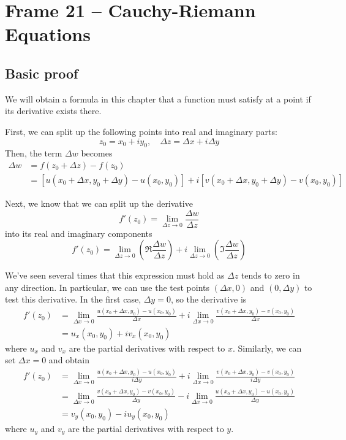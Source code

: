\documentclass{article}
\begin{document}
\clearpage
\section{Frame 21 -- Cauchy-Riemann Equations}
\subsection{Basic proof}
We will obtain a formula in this chapter that a function must satisfy at a point if its derivative exists there.

First, we can split up the following points into real and imaginary parts:
\[
	z_0 = x_0 + iy_0,	\quad \Delta z = \Delta x + i \Delta y	
\]
Then, the term $\Delta w$ becomes
\begin{align*}
	\Delta w &= f(z_0 + \Delta z) - f(z_0) \\
	&= [u(x_0 + \Delta x, y_0 + \Delta y) - u(x_0, y_0)]
	+ i[v(x_0 + \Delta x, y_0 + \Delta y) - v(x_0, y_0)]
\end{align*}

Next, we know that we can split up the derivative
\[
	f'(z_0) = \lim_{\Delta z \to 0} \frac{\Delta w}{\Delta z}
\]
into its real and imaginary components
\[
	f'(z_0) = \lim_{\Delta z \to 0} \left( \Re \frac{\Delta w}{\Delta z} \right)
	+ i\lim_{\Delta z \to 0} \left( \Im \frac{\Delta w}{\Delta z} \right)
\]

We've seen several times that this expression must hold as $\Delta z$ tends to zero in any direction. In particular, we can use the test points $(\Delta x, 0)$ and $(0, \Delta y)$ to test this derivative. In the first case, $\Delta y = 0$, so the derivative is
\begin{align*}
	f'(z_0) 
	&= \lim_{\Delta x \to 0} \frac{u(x_0 + \Delta x, y_0) - u(x_0, y_0)}{\Delta x}
	+i \lim_{\Delta x \to 0} \frac{v(x_0 + \Delta x, y_0) - v(x_0, y_0)}{\Delta x} \\
	&= u_x(x_0, y_0) + iv_x(x_0, y_0)
\end{align*}
where $u_x$ and $v_x$ are the partial derivatives with respect to $x$. Similarly, we can set $\Delta x = 0$ and obtain
\begin{align*}
	f'(z_0) 
	&= \lim_{\Delta x \to 0} \frac{u(x_0+ \Delta x,y_0) - u(x_0,y_0)}{i\Delta y}
	+i \lim_{\Delta x \to 0} \frac{v(x_0+ \Delta x,y_0) - v(x_0,y_0)}{i\Delta y} \\
	&= \lim_{\Delta x \to 0} \frac{v(x_0+ \Delta x,y_0) - v(x_0,y_0)}{\Delta y}
	-i \lim_{\Delta x \to 0} \frac{u(x_0+ \Delta x,y_0) - u(x_0,y_0)}{\Delta y}	\\
	&= v_y(x_0, y_0) - iu_y(x_0, y_0)
\end{align*}
where $u_y$ and $v_y$ are the partial derivatives with respect to $y$. 
\end{document}
